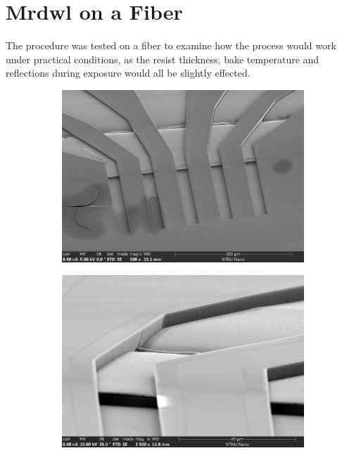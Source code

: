 \section{Mrdwl on a Fiber}
The procedure was tested on a fiber to examine how the process would work under practical conditions, as the resist thickness, bake temperature and reflections during exposure would all be slightly effected. 



\begin{figure}[h]
\centering
\begin{subfigure}{\textwidth}
  \centering
  \includegraphics[width=\linewidth]{fig/mr-DWL/mb_25_overview_002.jpg}
  \label{fig:sfig1}
\end{subfigure}%

\begin{subfigure}{\textwidth}
  \centering
  \includegraphics[width=\linewidth]{fig/mr-DWL/mb_25_step_004.jpg}
  \label{fig:sfig2}
\end{subfigure}%

\caption{}
\label{fig:si_sige}
\end{figure}


